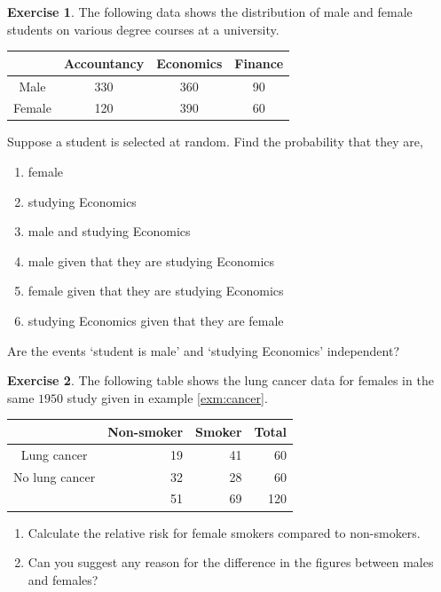 \documentclass[
]{book}
\theoremstyle{definition}
\theoremstyle{definition}
\theoremstyle{definition}
\newtheorem{exercise}{Exercise}[chapter]
\theoremstyle{definition}
\theoremstyle{remark}
\begin{document}
\begin{exercise}
The following data shows the distribution of male and female students on various degree courses at a university.

\begin{longtable}[]{@{}cccc@{}}
\toprule
& Accountancy & Economics & Finance\tabularnewline
\midrule
\endhead
Male & 330 & 360 & 90\tabularnewline
Female & 120 & 390 & 60\tabularnewline
\bottomrule
\end{longtable}

Suppose a student is selected at random. Find the probability that they are,

\begin{enumerate}
\def\labelenumi{\alph{enumi})}
\item
  female
\item
  studying Economics
\item
  male and studying Economics
\item
  male given that they are studying Economics
\item
  female given that they are studying Economics
\item
  studying Economics given that they are female
\end{enumerate}

Are the events `student is male' and `studying Economics' independent?
\end{exercise}

\begin{exercise}

The following table shows the lung cancer data for females in the same \(1950\) study given in example \ref{exm:cancer}.

\begin{longtable}[]{@{}crrr@{}}
\toprule
& Non-smoker & Smoker & Total\tabularnewline
\midrule
\endhead
Lung cancer & 19 & 41 & 60\tabularnewline
No lung cancer & 32 & 28 & 60\tabularnewline
& 51 & 69 & 120\tabularnewline
\bottomrule
\end{longtable}

\begin{enumerate}
\def\labelenumi{\alph{enumi})}
\item
  Calculate the relative risk for female smokers compared to non-smokers.
\item
  Can you suggest any reason for the difference in the figures between males and females?
\end{enumerate}

\end{exercise}
\end{document}
